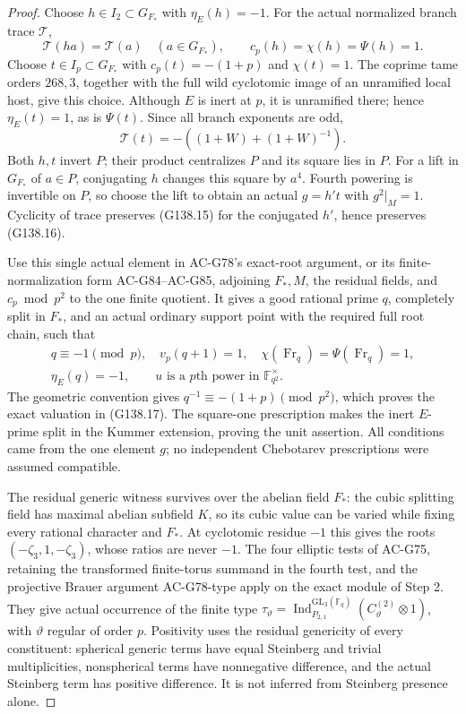 \begin{proof}
Choose \(h\in I_2\subset G_{F_*}\) with \(\eta_E(h)=-1\).
For the actual normalized branch trace \(\mathcal T\),
\[
 \mathcal T(ha)=\mathcal T(a)\quad(a\in G_{F_*}),\qquad
 c_p(h)=\chi(h)=\Psi(h)=1.
 \tag{G138.15}
\]
Choose \(t\in I_p\subset G_{F_*}\) with
\(c_p(t)=-(1+p)\) and \(\chi(t)=1\).
The coprime tame orders \(268,3\), together with the full wild
cyclotomic image of an unramified local host, give this choice.
Although \(E\) is inert at \(p\), it is unramified there;
hence \(\eta_E(t)=1\), as is \(\Psi(t)\).
Since all branch exponents are odd,
\[
             \mathcal T(t)=-((1+W)+(1+W)^{-1}).
 \tag{G138.16}
\]
Both \(h,t\) invert \(P\); their product centralizes \(P\)
and its square lies in \(P\).
For a lift in \(G_{F_*}\) of \(a\in P\), conjugating \(h\)
changes this square by \(a^4\).  Fourth powering is invertible
on \(P\), so choose the lift to obtain an actual \(g=h't\)
with \(g^2|_M=1\).  Cyclicity of trace preserves (G138.15)
for the conjugated \(h'\), hence preserves (G138.16).

Use this single actual element in AC-G78's exact-root argument,
or its finite-normalization form AC-G84--AC-G85, adjoining
\(F_*,M\), the residual fields, and \(c_p\bmod p^2\) to the
one finite quotient.  It gives a good rational prime \(q\),
completely split in \(F_*\), and an actual ordinary support
point with the required full root chain, such that
\[
 \begin{gathered}
 q\equiv-1\pmod p,\quad v_p(q+1)=1,\quad
 \chi(\operatorname{Fr}_q)=\Psi(\operatorname{Fr}_q)=1,\\
 \eta_E(q)=-1,\qquad
 u\text{ is a }p\text{th power in }\mathbb F_{q^2}^{\times}.
 \end{gathered}
 \tag{G138.17}
\]
The geometric convention gives
\(q^{-1}\equiv-(1+p)\pmod{p^2}\), which proves the exact
valuation in (G138.17).
The square-one prescription makes the inert \(E\)-prime split
in the Kummer extension, proving the unit assertion.
All conditions came from the one element \(g\); no independent
Chebotarev prescriptions were assumed compatible.

The residual generic witness survives over the abelian field
\(F_*\): the cubic splitting field has maximal abelian subfield
\(K\), so its cubic value can be varied while fixing every
rational character and \(F_*\).
At cyclotomic residue \(-1\) this gives the roots
\((-\zeta_3,1,-\zeta_3)\), whose ratios are never \(-1\).
The four elliptic tests of AC-G75, retaining the transformed
finite-torus summand in the fourth test, and the projective
Brauer argument AC-G78-type apply on the exact module of Step 2.
They give actual occurrence of the finite type
\(\tau_\vartheta=\operatorname{Ind}_{P_{2,1}}^{\mathrm{GL}_3(\mathbb F_q)}
(C_\vartheta^{(2)}\otimes1)\), with \(\vartheta\) regular of
order \(p\).  Positivity uses the residual genericity of every
constituent: spherical generic terms have equal Steinberg and
trivial multiplicities, nonspherical terms have nonnegative
difference, and the actual Steinberg term has positive difference.
It is not inferred from Steinberg presence alone.


\end{proof}
